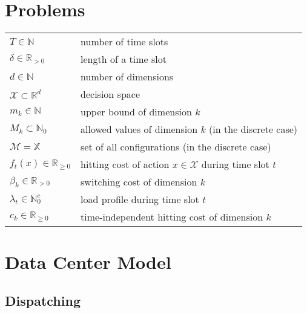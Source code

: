 \label{chapter:notation}

\section*{Problems}

\begin{tabularx}{\textwidth}{p{100pt}X}
    $T \in \mathbb{N}$ & number of time slots \\
    $\delta \in \mathbb{R}_{>0}$ & length of a time slot \\
    $d \in \mathbb{N}$ & number of dimensions \\
    $\mathcal{X} \subset \mathbb{R}^d$ & decision space \\
    $m_k \in \mathbb{N}$ & upper bound of dimension $k$ \\
    $M_k \subset \mathbb{N}_0$ & allowed values of dimension $k$ (in the discrete case) \\
    $\mathcal{M} = \mathbb{X}$ & set of all configurations (in the discrete case) \\
    $f_t(x) \in \mathbb{R}_{\geq 0}$ & hitting cost of action $x \in \mathcal{X}$ during time slot $t$ \\
    $\beta_k \in \mathbb{R}_{>0}$ & switching cost of dimension $k$ \\
    $\lambda_t \in \mathbb{N}_0^e$ & load profile during time slot $t$ \\
    $c_k \in \mathbb{R}_{\geq 0}$ & time-independent hitting cost of dimension $k$ \\
\end{tabularx}

\section*{Data Center Model}

\subsection*{Dispatching}

